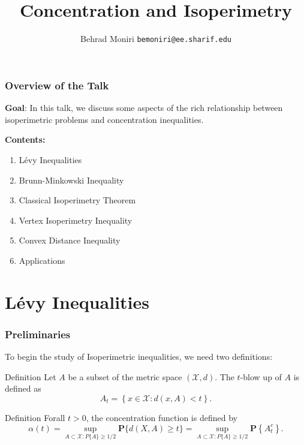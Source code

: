 \documentclass[usenames,dvipsnames, 10pt]{beamer}
\title[Concentration and Isoperimetry]{‌\vspace{0.5cm}\\
Concentration and Isoperimetry}
\author[Behrad Moniri]{
  Behrad Moniri
  \pdfnewline
  \texttt{bemoniri@ee.sharif.edu}
}
\institute{\small{EE Department - Sharif University of Technology}}
\begin{document}
\begin{frame}
\titlepage
\end{frame}



\begin{frame}
	\frametitle{Overview of the Talk}
	
	\textbf{Goal}: In this talk, we discuss some aspects of the rich relationship between isoperimetric problems and concentration inequalities.
	\pause
	
	\vspace{1cm}
	\textbf{Contents:}
	\vspace{0.5cm}	
	\begin{enumerate}
		\item L\'evy Inequalities
		\item Brunn-Minkowski Inequality
		\item Classical Isoperimetry Theorem
		\item Vertex Isoperimetry Inequality
		\item Convex Distance Inequality
		\item Applications
	\end{enumerate}
\end{frame}

\section{L\'evy Inequalities}

\begin{frame}
	\frametitle{Preliminaries}
	To begin the study of Isoperimetric inequalities, we need two definitions:
	
	\pause
	\begin{block}{Definition}
		Let $A$ be a subset of the metric space $(\mathcal{X}, d)$. The $t$-blow up of $A$ is defined as
		\begin{equation*}
		A_{t}=\left\{x \in \mathcal{X}: d(x, A)<t\right\}.
		\end{equation*}
	\end{block}

	\pause
	\begin{exampleblock}{Definition}
		Forall $t > 0$, the concentration function is defined by
		\begin{equation*}
			\alpha(t)=\sup _{A \subset \mathcal{X}: P\{A\} \geq 1 / 2} \boldsymbol{P}\{d(X, A) \geq t\}=\sup _{A \subset \mathcal{X}: P\{A\} \geq 1 / 2} \boldsymbol{P}\left\{A_{t}^{c}\right\}.
		\end{equation*}
	\end{exampleblock}


	

\end{frame}
\end{document}
